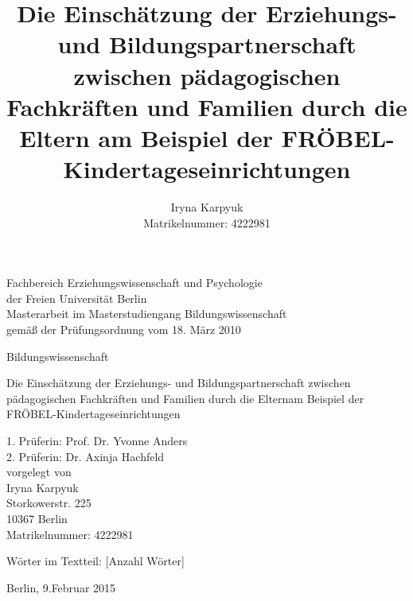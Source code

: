 \documentclass[12pt,a4paper]{article}
\author{Iryna Karpyuk \\
Matrikelnummer: 4222981}
\title{Die Einschätzung der Erziehungs- und Bildungspartnerschaft zwischen pädagogischen Fachkräften und Familien durch die Eltern am Beispiel der FRÖBEL-Kindertageseinrichtungen}
\begin{document}
\begin{titlepage}

\normalsize

\begin{singlespace}
\begin{center}
Fachbereich Erziehungswissenschaft und Psychologie\\
der Freien Universität Berlin\\
Masterarbeit im Masterstudiengang Bildungswissenschaft\\
{\small gemäß der Prüfungsordnung vom 18. März 2010}\\
\end{center}
\end{singlespace}

\vspace{30pt}
\begin{center}
{\Large Bildungswissenschaft}
\end{center}


\vspace{20pt}

\begin{center}
\LARGE{%
Die Einschätzung der Erziehungs- und Bildungspartnerschaft zwischen pädagogischen Fachkräften und Familien durch die Eltern\linebreak am Beispiel der FRÖBEL-Kindertageseinrichtungen
}%
\\  
\vspace{50pt}
 \end{center}
                         
 
\begin{flushleft}

1. Prüferin:  		\hspace {2cm}Prof. Dr. Yvonne Anders\\
\vspace{30pt}	
2. Prüferin:  		\hspace {2cm}Dr. Axinja Hachfeld\\
\vspace{50pt}
vorgelegt von\\ 
Iryna Karpyuk \\
Storkowerstr. 225\\
10367 Berlin\\
Matrikelnummer: 4222981\\
\end{flushleft}                  
Wörter im Textteil: [Anzahl Wörter]\\     

\begin{center}
\vspace{30pt}

Berlin, 9.Februar 2015
\end{center}
\end{titlepage}                                             
\pagebreak
\end{document}
